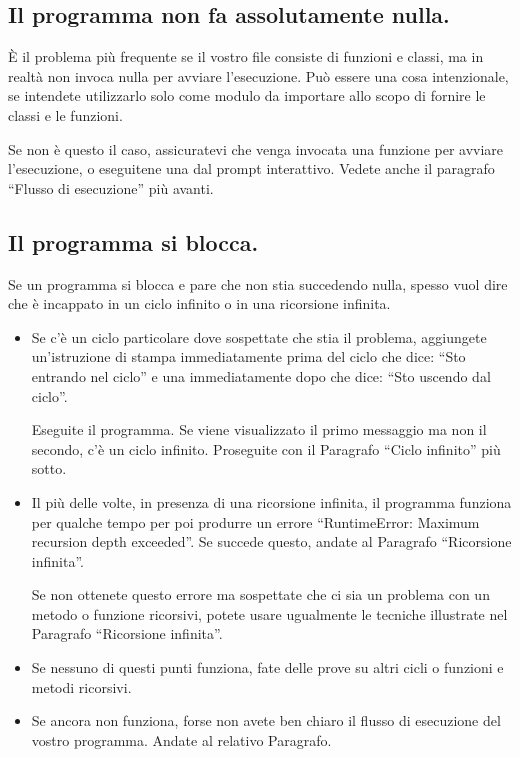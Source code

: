 \documentclass[10pt]{book}
\begin{document}
\subsection{Il programma non fa assolutamente nulla.}

È il problema più frequente se il vostro file consiste di funzioni e classi, ma in realtà non invoca nulla per avviare l'esecuzione. Può essere una cosa intenzionale, se intendete utilizzarlo solo come modulo da importare allo scopo di fornire le classi e le funzioni.

Se non è questo il caso, assicuratevi che venga invocata una funzione per avviare l'esecuzione, o eseguitene una dal prompt interattivo. Vedete anche il paragrafo ``Flusso di esecuzione'' più avanti.


\subsection{Il programma si blocca.}

Se un programma si blocca e pare che non stia succedendo nulla, spesso vuol dire che è incappato in un ciclo infinito o in una ricorsione infinita.

\begin{itemize}

\item Se c'è un ciclo particolare dove sospettate che stia il problema, aggiungete un'istruzione di stampa immediatamente prima del ciclo che dice:
``Sto entrando nel ciclo'' e una immediatamente dopo che dice:
``Sto uscendo dal ciclo''.

Eseguite il programma. Se viene visualizzato il primo messaggio ma non il secondo, c'è un ciclo infinito. Proseguite con il Paragrafo ``Ciclo infinito'' più sotto.

\item Il più delle volte, in presenza di una ricorsione infinita, il programma funziona per qualche tempo per poi produrre un errore ``RuntimeError: Maximum
recursion depth exceeded''.  Se succede questo, andate al Paragrafo
``Ricorsione infinita''.

Se non ottenete questo errore ma sospettate che ci sia un problema con un metodo o funzione ricorsivi, potete usare ugualmente le tecniche illustrate nel Paragrafo ``Ricorsione infinita''.

\item Se nessuno di questi punti funziona, fate delle prove su altri cicli o funzioni e metodi ricorsivi.

\item Se ancora non funziona, forse non avete ben chiaro il flusso di esecuzione del vostro programma. Andate al relativo Paragrafo.

\end{itemize}
\end{document}
